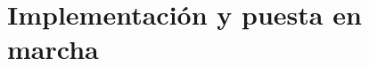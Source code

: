 \documentclass{subfiles}
\begin{document}
  \chapter{Implementación y puesta en marcha}
  \label{chap:5}

\end{document}

